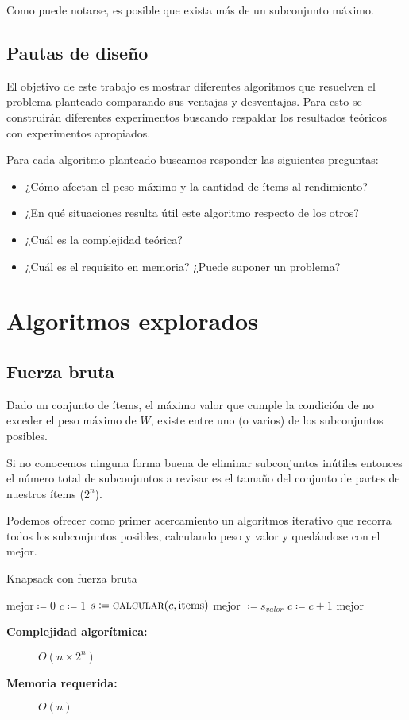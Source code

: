 \documentclass[fleqn, 11pt]{article}
\def\is{\coloneqq}
\begin{document}
Como puede notarse, es posible que exista más de un subconjunto máximo.

\subsection{Pautas de diseño}

El objetivo de este trabajo es mostrar diferentes algoritmos que resuelven el
problema planteado comparando sus ventajas y desventajas. Para esto se
construirán diferentes experimentos buscando respaldar los resultados teóricos
con experimentos apropiados.

Para cada algoritmo planteado buscamos responder las siguientes preguntas:

\begin{itemize}
\item[] ¿Cómo afectan el peso máximo y la cantidad de ítems al rendimiento?
\item[] ¿En qué situaciones resulta útil este algoritmo respecto de los otros?
\item[] ¿Cuál es la complejidad teórica?
\item[] ¿Cuál es el requisito en memoria? ¿Puede suponer un problema?
\end{itemize}

\section{Algoritmos explorados}

\subsection{Fuerza bruta}

Dado un conjunto de ítems, el máximo valor que cumple la condición de no
exceder el peso máximo de $W$, existe entre uno (o varios) de los subconjuntos
posibles.

Si no conocemos ninguna forma buena de eliminar subconjuntos inútiles entonces
el número total de subconjuntos a revisar es el tamaño del conjunto de partes
de nuestros ítems ($2^n$).

Podemos ofrecer como primer acercamiento un algoritmos iterativo que recorra todos los
subconjuntos posibles, calculando peso y valor y quedándose con el mejor.

\begin{algorithm}
\caption{Knapsack con fuerza bruta}
\begin{algorithmic}[1]
\Statex
{}
\State $\text{mejor} \is 0$
\State $c \is 1$
	\State $s \is \Call{calcular}{c, \text{items}}$
		\State mejor $\is s_{valor}$
	\EndIf
	\State $c \is c + 1$
\EndWhile
\State \Return mejor
\EndFunction
\end{algorithmic}
\begin{description}
	\item[\textbf{Complejidad algorítmica:}] $O(n \times 2^n)$
	\item[\textbf{Memoria requerida:}] $O(n)$
\end{description}
\end{algorithm}
\end{document}
